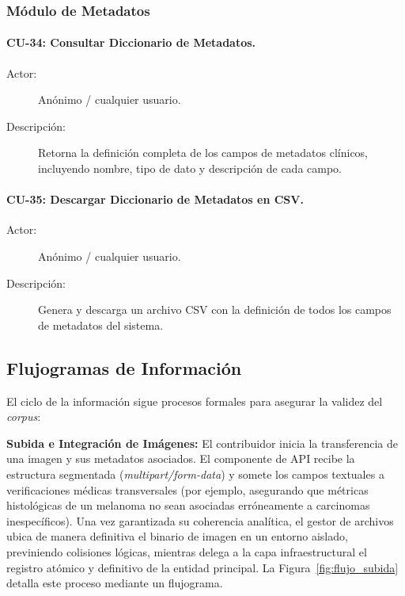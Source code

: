 \subsubsection{Módulo de Metadatos}

\paragraph{CU-34: Consultar Diccionario de Metadatos.}
\begin{description}
    \item[Actor:] Anónimo / cualquier usuario.
    \item[Descripción:] Retorna la definición completa de los campos de metadatos clínicos, incluyendo nombre, tipo de dato y descripción de cada campo.
\end{description}

\paragraph{CU-35: Descargar Diccionario de Metadatos en CSV.}
\begin{description}
    \item[Actor:] Anónimo / cualquier usuario.
    \item[Descripción:] Genera y descarga un archivo CSV con la definición de todos los campos de metadatos del sistema.
\end{description}

\subsection{Flujogramas de Información}

El ciclo de la información sigue procesos formales para asegurar la validez del \textit{corpus}:

\textbf{Subida e Integración de Imágenes:}
El contribuidor inicia la transferencia de una imagen y sus metadatos asociados. El componente de API 
recibe la estructura segmentada (\textit{multipart/form-data}) y somete los campos textuales a 
verificaciones médicas transversales (por ejemplo, asegurando que métricas histológicas de un 
melanoma no sean asociadas erróneamente a carcinomas inespecíficos). Una vez garantizada su 
coherencia analítica, el gestor de archivos ubica de manera definitiva el binario de imagen 
en un entorno aislado, previniendo colisiones lógicas, mientras delega a la capa infraestructural 
el registro atómico y definitivo de la entidad principal. La Figura~\ref{fig:flujo_subida} 
detalla este proceso mediante un flujograma.

